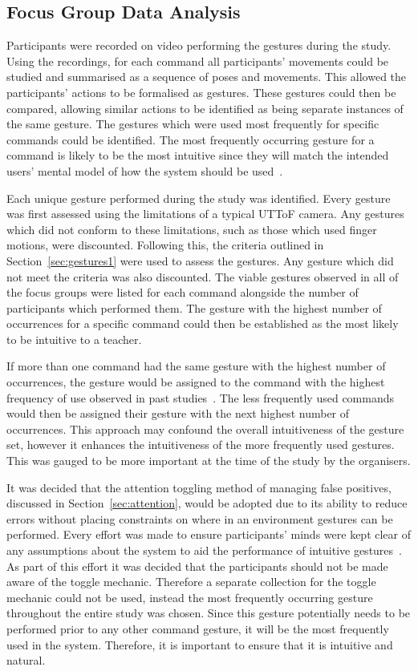 \documentclass[manuscript, review, screen]{acmart}
\begin{document}
\subsection{Focus Group Data Analysis}
\label{subsec:analysis}  

Participants were recorded on video performing the gestures during the study.
Using the recordings, for each command all participants' movements could be studied and summarised as a sequence of poses and movements.
This allowed the participants' actions to be formalised as gestures.
These gestures could then be compared, allowing similar actions to be identified as being separate instances of the same gesture.
The gestures which were used most frequently for specific commands could be identified.
The most frequently occurring gesture for a command is likely to be the most intuitive since they will match the intended users' mental model of how the system should be used~\cite{Nielsen2004,Ruiz2011,Wobbrock2009}.

Each unique gesture performed during the study was identified.
Every gesture was first assessed using the limitations of a typical \ac{UTToF} camera.
Any gestures which did not conform to these limitations, such as those which used finger motions, were discounted.
Following this, the criteria outlined in Section~\ref{sec:gestures1} were used to assess the gestures.
Any gesture which did not meet the criteria was also discounted.
The viable gestures observed in all of the focus groups were listed for each command alongside the number of participants which performed them.
The gesture with the highest number of occurrences for a specific command could then be established as the most likely to be intuitive to a teacher.

If more than one command had the same gesture with the highest number of occurrences, the gesture would be assigned to the command with the highest frequency of use observed in past studies~\cite{HatchA.HigginsS&Mercier2009}.
The less frequently used commands would then be assigned their gesture with the next highest number of occurrences.
This approach may confound the overall intuitiveness of the gesture set, however it enhances the intuitiveness of the more frequently used gestures.
This was gauged to be more important at the time of the study by the organisers.

It was decided that the attention toggling method of managing false positives, discussed in Section~\ref{sec:attention}, would be adopted due to its ability to reduce errors without placing constraints on where in an environment gestures can be performed.
Every effort was made to ensure participants' minds were kept clear of any assumptions about the system to aid the performance of intuitive gestures~\cite{Nielsen2004}.
As part of this effort it was decided that the participants should not be made aware of the toggle mechanic.
Therefore a separate collection for the toggle mechanic could not be used, instead the most frequently occurring gesture throughout the entire study was chosen.
Since this gesture potentially needs to be performed prior to any other command gesture, it will be the most frequently used in the system.
Therefore, it is important to ensure that it is intuitive and natural.
\end{document}
